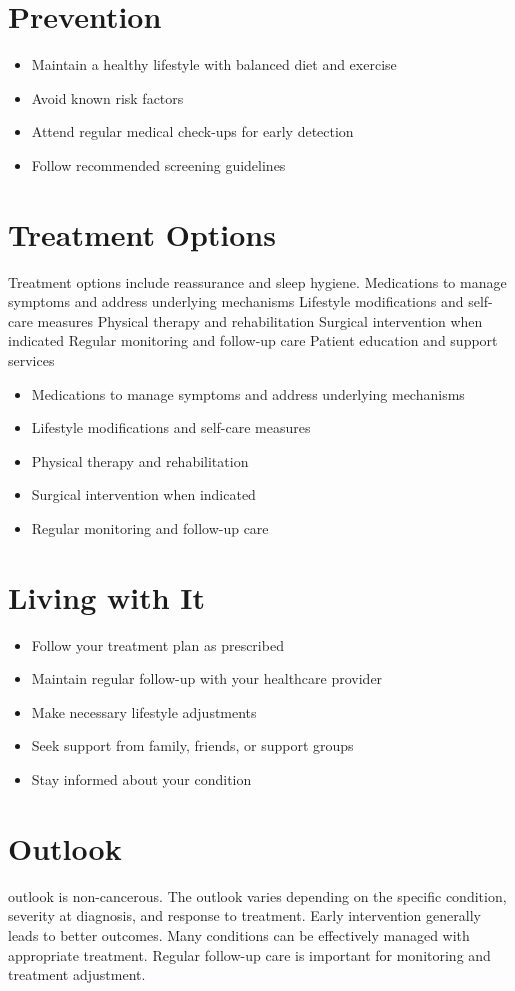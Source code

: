 \section{Prevention}
\begin{itemize}[noitemsep]
  \item Maintain a healthy lifestyle with balanced diet and exercise
  \item Avoid known risk factors
  \item Attend regular medical check-ups for early detection
  \item Follow recommended screening guidelines
\end{itemize}
\section{Treatment Options}
Treatment options include reassurance and sleep hygiene. Medications to manage symptoms and address underlying mechanisms Lifestyle modifications and self-care measures Physical therapy and rehabilitation Surgical intervention when indicated Regular monitoring and follow-up care Patient education and support services

\begin{itemize}[noitemsep]
  \item Medications to manage symptoms and address underlying mechanisms
  \item Lifestyle modifications and self-care measures
  \item Physical therapy and rehabilitation
  \item Surgical intervention when indicated
  \item Regular monitoring and follow-up care
\end{itemize}
\section{Living with It}
\begin{itemize}[noitemsep]
  \item Follow your treatment plan as prescribed
  \item Maintain regular follow-up with your healthcare provider
  \item Make necessary lifestyle adjustments
  \item Seek support from family, friends, or support groups
  \item Stay informed about your condition
\end{itemize}
\section{Outlook}
outlook is non-cancerous. The outlook varies depending on the specific condition, severity at diagnosis, and response to treatment. Early intervention generally leads to better outcomes. Many conditions can be effectively managed with appropriate treatment. Regular follow-up care is important for monitoring and treatment adjustment.
